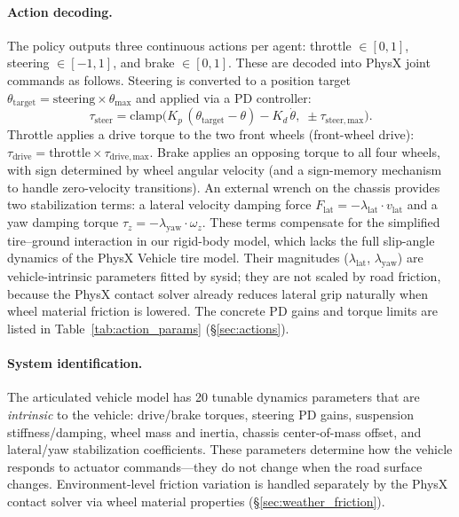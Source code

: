 \paragraph{Action decoding.}
The policy outputs three continuous actions per agent: throttle $\in [0,1]$, steering $\in [-1,1]$, and brake $\in [0,1]$.
These are decoded into PhysX joint commands as follows.
Steering is converted to a position target $\theta_{\mathrm{target}} = \text{steering} \times \theta_{\max}$ and applied via a PD controller:
\begin{equation}
\label{eq:steer_pd}
\tau_{\mathrm{steer}} = \mathrm{clamp}\!\bigl(K_p\,(\theta_{\mathrm{target}} - \theta) - K_d\,\dot{\theta},\;\pm\tau_{\mathrm{steer,max}}\bigr).
\end{equation}
Throttle applies a drive torque to the two front wheels (front-wheel drive): $\tau_{\mathrm{drive}} = \text{throttle} \times \tau_{\mathrm{drive,max}}$.
Brake applies an opposing torque to all four wheels, with sign determined by wheel angular velocity (and a sign-memory mechanism to handle zero-velocity transitions).
An external wrench on the chassis provides two stabilization terms: a lateral velocity damping force $F_{\mathrm{lat}} = -\lambda_{\mathrm{lat}} \cdot v_{\mathrm{lat}}$ and a yaw damping torque $\tau_z = -\lambda_{\mathrm{yaw}} \cdot \omega_z$.
These terms compensate for the simplified tire--ground interaction in our rigid-body model, which lacks the full slip-angle dynamics of the PhysX Vehicle tire model.
Their magnitudes ($\lambda_{\mathrm{lat}}$, $\lambda_{\mathrm{yaw}}$) are vehicle-intrinsic parameters fitted by sysid; they are not scaled by road friction, because the PhysX contact solver already reduces lateral grip naturally when wheel material friction is lowered.
The concrete PD gains and torque limits are listed in Table~\ref{tab:action_params} (\S\ref{sec:actions}).


\paragraph{System identification.}
The articulated vehicle model has 20 tunable dynamics parameters that are \emph{intrinsic} to the vehicle: drive/brake torques, steering PD gains, suspension stiffness/damping, wheel mass and inertia, chassis center-of-mass offset, and lateral/yaw stabilization coefficients.
These parameters determine how the vehicle responds to actuator commands---they do not change when the road surface changes.
Environment-level friction variation is handled separately by the PhysX contact solver via wheel material properties (\S\ref{sec:weather_friction}).

